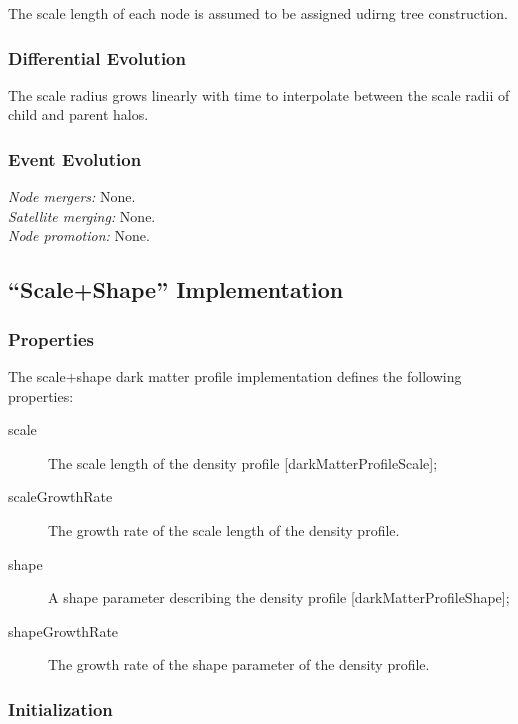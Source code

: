 The scale length of each node is assumed to be assigned udirng tree construction.

\subsubsection{Differential Evolution}

The scale radius grows linearly with time to interpolate between the scale radii of child and parent halos.

\subsubsection{Event Evolution}

\noindent\emph{Node mergers:} None.\\

\noindent\emph{Satellite merging:} None.\\

\noindent\emph{Node promotion:} None.\\

\subsection{``Scale+Shape'' Implementation}\label{sec:DarkMatterProfileScaleShape}

\subsubsection{Properties}

The scale$+$shape dark matter profile implementation defines the following properties:
\begin{description}
 \item [{\normalfont \ttfamily scale}] The scale length of the density profile [{\normalfont \ttfamily darkMatterProfileScale}];
 \item [{\normalfont \ttfamily scaleGrowthRate}] The growth rate of the scale length of the density profile.
 \item [{\normalfont \ttfamily shape}] A shape parameter describing the density profile [{\normalfont \ttfamily darkMatterProfileShape}];
 \item [{\normalfont \ttfamily shapeGrowthRate}] The growth rate of the shape parameter of the density profile.
\end{description}

\subsubsection{Initialization}

